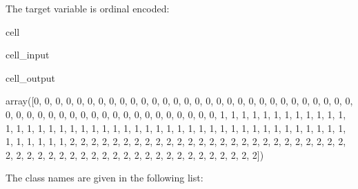 \documentclass[letterpaper,10pt,english]{jupyterBook}
\begin{document}
\sphinxAtStartPar
The target variable is ordinal encoded:

\begin{sphinxuseclass}{cell}\begin{sphinxVerbatimInput}

\begin{sphinxuseclass}{cell_input}
\begin{sphinxVerbatim}[commandchars=\\\{\}]
\end{sphinxVerbatim}

\end{sphinxuseclass}\end{sphinxVerbatimInput}
\begin{sphinxVerbatimOutput}

\begin{sphinxuseclass}{cell_output}
\begin{sphinxVerbatim}[commandchars=\\\{\}]
array([0, 0, 0, 0, 0, 0, 0, 0, 0, 0, 0, 0, 0, 0, 0, 0, 0, 0, 0, 0, 0, 0,
       0, 0, 0, 0, 0, 0, 0, 0, 0, 0, 0, 0, 0, 0, 0, 0, 0, 0, 0, 0, 0, 0,
       0, 0, 0, 0, 0, 0, 1, 1, 1, 1, 1, 1, 1, 1, 1, 1, 1, 1, 1, 1, 1, 1,
       1, 1, 1, 1, 1, 1, 1, 1, 1, 1, 1, 1, 1, 1, 1, 1, 1, 1, 1, 1, 1, 1,
       1, 1, 1, 1, 1, 1, 1, 1, 1, 1, 1, 1, 2, 2, 2, 2, 2, 2, 2, 2, 2, 2,
       2, 2, 2, 2, 2, 2, 2, 2, 2, 2, 2, 2, 2, 2, 2, 2, 2, 2, 2, 2, 2, 2,
       2, 2, 2, 2, 2, 2, 2, 2, 2, 2, 2, 2, 2, 2, 2, 2, 2, 2])
\end{sphinxVerbatim}

\end{sphinxuseclass}\end{sphinxVerbatimOutput}

\end{sphinxuseclass}
\sphinxAtStartPar
The class names are given in the following list:
\end{document}
